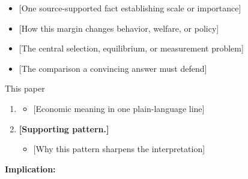 \documentclass[11pt, aspectratio=169]{beamer}
\title[\PaperShortTitle]{\PaperTitle}
\author[\AuthorShort]{\TitleAuthorBlock}
\institute{\TitleAffiliationBlock}
\date[\VenueShort]{\VenueDate}
\begin{document}
\begin{frame}[plain]
  \titlepage
\end{frame}
\addtocounter{framenumber}{-1}

\begin{frame}[t]{\KeyQuestion}
  \medskip
  \begin{itemize}\setlength{\itemsep}{0.55em}
    \item {[One source-supported fact establishing scale or importance]}
    \item {[How this margin changes behavior, welfare, or policy]}
  \end{itemize}

  \medskip
  \begin{itemize}\setlength{\itemsep}{0.55em}
    \item {[The central selection, equilibrium, or measurement problem]}
    \item {[The comparison a convincing answer must defend]}
  \end{itemize}
  \medskip
\end{frame}

\begin{frame}{This paper}
  \bigskip
  \begin{enumerate}\setlength{\itemsep}{1.0em}
    \item {} \ResultHeadlineSlide
      \vspace{0.14em}
      \begin{itemize}\setlength{\itemsep}{0.38em}
        \item {[Economic meaning in one plain-language line]}
      \end{itemize}
    \item \textbf{[Supporting pattern.]} \ResultSupportSlide
      \vspace{0.14em}
      \begin{itemize}\setlength{\itemsep}{0.38em}
        \item {[Why this pattern sharpens the interpretation]}
      \end{itemize}
  \end{enumerate}
  \bigskip
  \textbf{Implication:} \ResultImplicationSlide
\end{frame}
\end{document}
